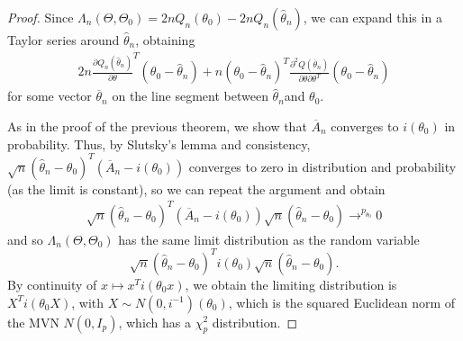 \begin{proof}
  Since $\Lambda_{n}(\Theta, \Theta_{0}) = 2n Q_{n}(\theta_{0}) - 2n
  Q_{n}(\hat \theta_{n})$, we can expand this in a Taylor series
  around $\hat \theta_{n}$, obtaining
  \begin{align}
    \label{eq:58}
    2 n \frac{\partial Q_{n}(\hat \theta_{n})}{\partial
      \theta}^{T}(\theta_{0} - \hat \theta_{n}) + n(\theta_{0} - \hat
    \theta_{n})^{T} \frac{\partial^{2} Q(\overline
      \theta_{n})}{\partial \theta \partial \theta^{T}} (\theta_{0} -
    \hat \theta_{n})
  \end{align} for some vector $\overline \theta_{n}$ on the line
  segment between $\hat \theta_{n}$and $\theta_{0}$.

  As in the proof of the previous theorem, we show that $\overline
  A_{n}$ converges to $i(\theta_{0})$ in probability.  Thus, by
  Slutsky's lemma and consistency, $\sqrt{n}(\hat \theta_{n} -
  \theta_{0})^{T}(\overline A_{n} - i(\theta_{0}))$ converges to zero
  in distribution and probability (as the limit is constant), so we can
  repeat the argument and obtain
  \begin{align}
    \label{eq:59}
    \sqrt{n} (\hat \theta_{n} - \theta_{0})^{T} (\overline A_{n} -
    i(\theta_{0})) \sqrt{n}(\hat \theta_{n} - \theta_{0})
    \rightarrow^{p_{\theta_{0}}} 0
  \end{align} and so $\Lambda_{n}(\Theta, \Theta_{0})$ has the same
  limit distribution as the random variable
  \begin{equation}
    \label{eq:60}
    \sqrt{n}(\hat \theta_{n} - \theta_{0})^{T} i(\theta_{0})
    \sqrt{n}(\hat \theta_{n} - \theta_{0}).
  \end{equation}  By continuity of $x \mapsto x^{T} i(\theta_{0} x)$,
  we obtain the limiting distribution is $X^{T} i(\theta_{0} X)$, with
  $X \sim N(0, i^{-1})(\theta_{0})$, which is the squared Euclidean
  norm of the MVN  $N(0, I_{p})$, which has a $\chi^{2}_{p}$ distribution.
\end{proof}


